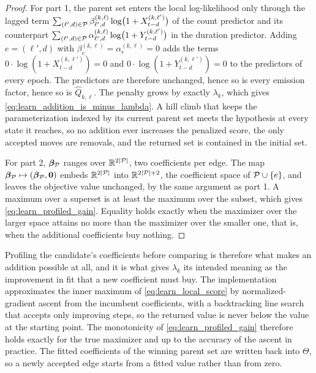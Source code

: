 \begin{proof}
For part 1, the parent set enters the local log-likelihood only through the lagged term
$\sum_{(\ell',d) \in {\mathcal{P}}} \beta_{\ell',d}^{(k,\ell)} \log\!\big(1 + X_{t-d}^{(k,\ell')}\big)$ of
the count predictor and its counterpart
$\sum_{(\ell',d) \in {\mathcal{P}}} \alpha_{\ell',d}^{(k,\ell)} \log\!\big(1 + Y_{t-d}^{(k,\ell')}\big)$ in
the duration predictor. Adding $e = (\ell',d)$ with $\beta_e^{(k,\ell)} = \alpha_e^{(k,\ell)} = 0$
adds the terms $0 \cdot \log(1+X_{t-d}^{(k,\ell')}) = 0$ and $0 \cdot \log(1+Y_{t-d}^{(k,\ell')})
= 0$ to the predictors of every epoch. The predictors are therefore unchanged, hence so is every
emission factor, hence so is $\widehat{Q}_{k,\ell}$. The penalty grows by exactly $\lambda_k$,
which gives \cref{eq:learn_addition_is_minus_lambda}. A hill climb that keeps the parameterization
indexed by its current parent set meets the hypothesis at every state it reaches, so no addition
ever increases the penalized score, the only accepted moves are removals, and the returned set is
contained in the initial set.

For part 2, ${\boldsymbol{\beta}}_{\mathcal{P}}$ ranges over ${\mathbb{R}}^{2|{\mathcal{P}}|}$, two coefficients per edge. The map
${\boldsymbol{\beta}}_{\mathcal{P}} \mapsto ({\boldsymbol{\beta}}_{\mathcal{P}}, {\bm{0}})$ embeds ${\mathbb{R}}^{2|{\mathcal{P}}|}$ into ${\mathbb{R}}^{2|{\mathcal{P}}|+2}$, the
coefficient space of ${\mathcal{P}} \cup \{e\}$, and leaves the objective value unchanged, by the same
argument as part 1. A maximum over a superset is at least the maximum over the subset, which gives
\cref{eq:learn_profiled_gain}. Equality holds exactly when the maximizer over the larger space
attains no more than the maximizer over the smaller one, that is, when the additional coefficients
buy nothing.
\end{proof}

\begin{remark}
\label{rem:learn_profile_practice}
Profiling the candidate's coefficients before comparing is therefore what makes an addition
possible at all, and it is what gives $\lambda_k$ its intended meaning as the improvement in fit
that a new coefficient must buy. The implementation approximates the inner maximum of
\cref{eq:learn_local_score} by normalized-gradient ascent from the incumbent coefficients, with a
backtracking line search that accepts only improving steps, so the returned value is never below
the value at the starting point. The monotonicity of \cref{eq:learn_profiled_gain} therefore
holds exactly for the true maximizer and up to the accuracy of the ascent in practice. The fitted
coefficients of the winning parent set are written back into $\Theta$, so a newly accepted edge
starts from a fitted value rather than from zero.
\end{remark}

